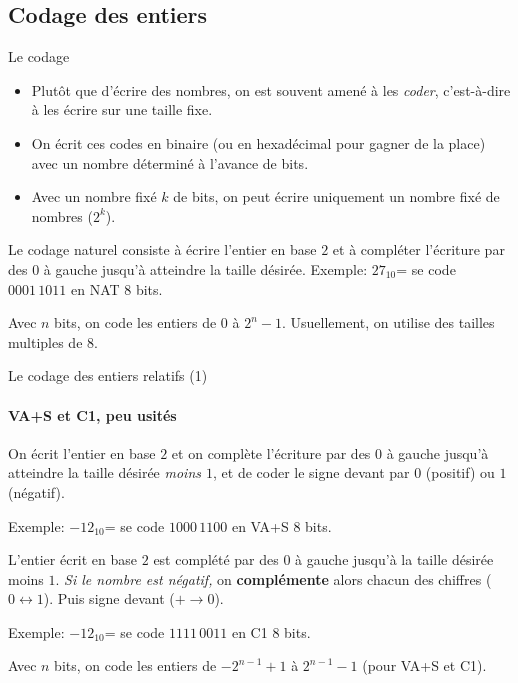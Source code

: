 \subsection{Codage des entiers}
\begin{frame}{Le codage}
  \begin{itemize}
  \item Plutôt que d'écrire des nombres, on est souvent amené à les
    \emph{coder}, c'est-à-dire à les écrire sur une taille fixe.
  \item On écrit ces codes en binaire (ou en hexadécimal pour gagner de la
    place) avec un nombre déterminé à l'avance de bits.
  \item Avec un nombre fixé $k$ de bits, on peut écrire uniquement un nombre
    fixé de nombres ($2^k$).
  \end{itemize}
  \begin{definition}
    Le codage naturel consiste à écrire l'entier en base $2$ et à
    compléter l'écriture par des $0$ à gauche jusqu'à atteindre la taille
    désirée. Exemple: $27_{10}$= se code $0001\,1011$ en NAT 8 bits.

    Avec $n$ bits, on code les entiers de $0$ à $2^n-1$. Usuellement, on
    utilise des tailles multiples de 8.
  \end{definition}
\end{frame}
\begin{frame}{Le codage des entiers relatifs (1)}
  \framesubtitle{VA+S et C1, peu usités}
  \begin{definition}
    On écrit l'entier en base $2$ et on complète l'écriture par des $0$ à
    gauche jusqu'à atteindre la taille désirée \emph{moins $1$}, et de coder le
    signe devant par $0$ (positif) ou $1$ (négatif).

    Exemple: $-12_{10}$= se code $1000\,1100$ en VA+S 8 bits.
  \end{definition}
  \begin{definition}
    L'entier écrit en base $2$ est complété par des $0$
    à gauche jusqu'à la taille désirée moins $1$. \emph{Si le nombre
      est négatif,} on \textbf{complémente} alors chacun des chiffres
    ($0\leftrightarrow1$). Puis signe devant ($+\rightarrow0$).

    Exemple: $-12_{10}$= se code $1111\,0011$ en C1 8 bits.
  \end{definition}
  Avec $n$ bits, on code les entiers de $-2^{n-1}+1$ à $2^{n-1}-1$ (pour VA+S et C1).
\end{frame}
